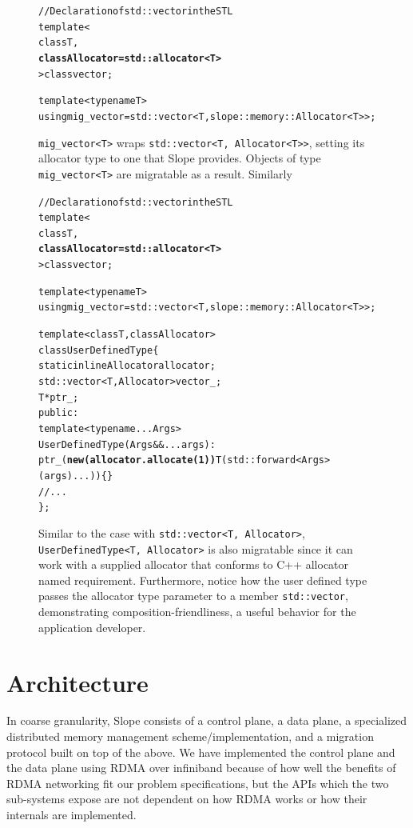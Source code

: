 \begin{figure}[H]
\begin{alltt}
// Declaration of std::vector in the STL
template<
    class T,
    \textbf{class Allocator = std::allocator<T>}
> class vector;

template<typename T>
using mig_vector = std::vector<T, slope::memory::Allocator<T>>;

\end{alltt}
\caption{
\texttt{mig\_vector<T>} wraps \texttt{std{::}vector<T, Allocator<T>>}, setting
its allocator type to one that Slope provides. Objects of type
\texttt{mig\_vector<T>} are migratable as a result. Similarly
}
\end{figure}





\begin{figure}[H]
\begin{alltt}
// Declaration of std::vector in the STL
template<
    class T,
    \textbf{class Allocator = std::allocator<T>}
> class vector;

template<typename T>
using mig_vector = std::vector<T, slope::memory::Allocator<T>>;

template<class T, class Allocator>
class UserDefinedType \{
  static inline Allocator allocator;
  std::vector<T, Allocator> vector_;
  T *ptr_;
 public:
  template<typename... Args>
  UserDefinedType(Args&&... args):
    ptr_(\textbf{new (allocator.allocate(1))} T(std::forward<Args>(args)...)) \{ \}
  // ...
\};

\end{alltt}
\caption{
Similar to the case with \texttt{std{::}vector<T, Allocator>},
\texttt{UserDefinedType<T, Allocator>} is also migratable since it can work
with a supplied allocator that conforms to C++ allocator named requirement.
Furthermore, notice how the user defined type passes the allocator type parameter
to a member \texttt{std{::}vector}, demonstrating composition-friendliness, a
useful behavior for the application developer.
}
\end{figure}


\section{Architecture}
In coarse granularity, Slope consists of a control plane, a data plane,
a specialized distributed memory management
scheme/implementation, and a migration protocol
built on top
of the above. We have implemented the control plane and the data plane using
RDMA over infiniband because of how well the benefits of RDMA networking
fit our problem specifications, but the APIs which the two
sub-systems expose are not dependent on how RDMA works or how their internals
are implemented.

